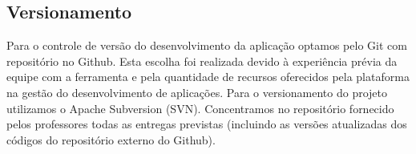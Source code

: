 \subsection{Versionamento}
Para o controle de versão do desenvolvimento da aplicação optamos pelo Git com repositório no Github. Esta escolha foi realizada devido à experiência prévia da equipe com a ferramenta e pela quantidade de recursos oferecidos pela plataforma na gestão do desenvolvimento de aplicações.
Para o versionamento do projeto utilizamos o Apache Subversion (SVN). Concentramos no repositório fornecido pelos professores todas as entregas previstas (incluindo as versões atualizadas dos códigos do repositório externo do Github).



